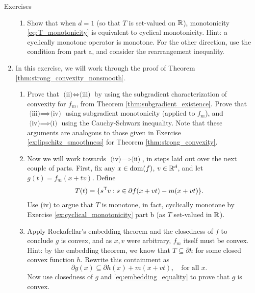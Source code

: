 \begin{xcb}{Exercises}
\begin{enumerate}[label=\thechapter.\arabic*]
\begin{enumerate}[label=\alph*.]
\item Show that when $d=1$ (so that $T$ is set-valued on $\mathbb{R}$), 
  monotonicity \eqref{eq:T_monotonicity} is equivalent to cyclical
  monotonicity. Hint: a cyclically monotone operator is monotone. For the other
  direction, use the condition from part a, and consider the rearrangement
  inequality.        

\end{enumerate}

\item \label{ex:strong_convexity_nonsmooth}
  In this exercise, we will work through the proof of Theorem
  \ref{thm:strong_convexity_nonsmooth}. 

\begin{enumerate}[label=\alph*.]
\item Prove that $\text{(ii)} \iff \text{(iii)}$ by using the subgradient
  characterization of convexity for $f_m$, from Theorem
  \ref{thm:subgradient_existence}. Prove that $\text{(iii)} \implies
  \text{(iv)}$ using subgradient monotonicity (applied to $f_m$), and
  $\text{(iv)} \implies \text{(i)}$ using the Cauchy-Schwarz inequality. Note
  that these arguments are analogous to those given in Exercise 
  \ref{ex:lipschitz_smoothness} for Theorem \ref{thm:strong_convexity}.   
  
\item Now we will work towards $\text{(iv)} \implies \text{(ii)}$, in steps laid
  out over the next couple of parts. First, fix any $x \in \operatorname{dom}(f)$, $v \in
  \mathbb{R}^d$, and let $g(t) = f_m(x + tv)$. Define 
  \[
  T(t) = \{ s^{\mathsf{T}} v : s \in \partial f(x+vt) - m(x+vt) \}.
  \]
  Use (iv) to argue that $T$ is monotone, in fact, cyclically monotone by
  Exercise \ref{ex:cyclical_monotonicity} part b (as $T$ set-valued in $\mathbb{R}$). 

\item Apply Rockafellar's embedding theorem and the closedness of $f$ to
  conclude $g$ is convex, and as $x,v$ were arbitrary, $f_m$ itself must be
  convex. Hint: by the embedding theorem, we know that $T \subseteq \partial h$
  for some closed convex function $h$. Rewrite this containment as 
  \[
  \partial g(x) \subseteq \partial h(x) + m(x+vt), \quad \text{for all $x$}.
  \]
  Now use closedness of $g$ and \eqref{eq:embedding_equality} to prove that $g$
  is convex. 
\end{enumerate}


\end{enumerate}
\end{xcb}
